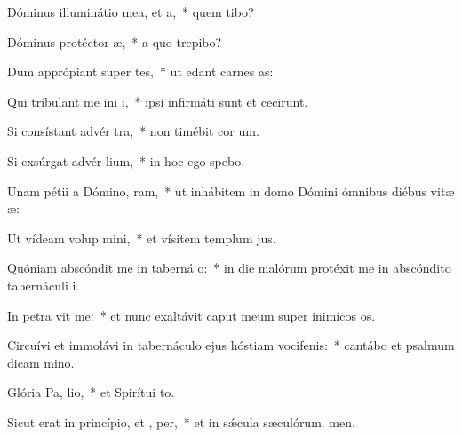 \item Dóminus illuminátio mea, et  a,~* quem tibo?
\item Dóminus protéctor  æ,~* a quo trepibo?
\item Dum apprópiant super  tes,~* ut edant carnes as:
\item Qui tríbulant me ini i,~* ipsi infirmáti sunt et cecirunt.
\item Si consístant advér  tra,~* non timébit cor um.
\item Si exsúrgat advér  lium,~* in hoc ego spebo.
\item Unam pétii a Dómino,  ram,~* ut inhábitem in domo Dómini ómnibus diébus vitæ æ:
\item Ut vídeam volup mini,~* et vísitem templum jus.
\item Quóniam abscóndit me in taberná o:~* in die malórum protéxit me in abscóndito tabernáculi i.
\item In petra vit me:~* et nunc exaltávit caput meum super inimícos os.
\item Circuívi et immolávi in tabernáculo ejus hóstiam vocifenis:~* cantábo et psalmum dicam mino.
\item Glória Pa,  lio,~* et Spirítui to.
\item Sicut erat in princípio, et ,  per,~* et in sǽcula sæculórum. men.
